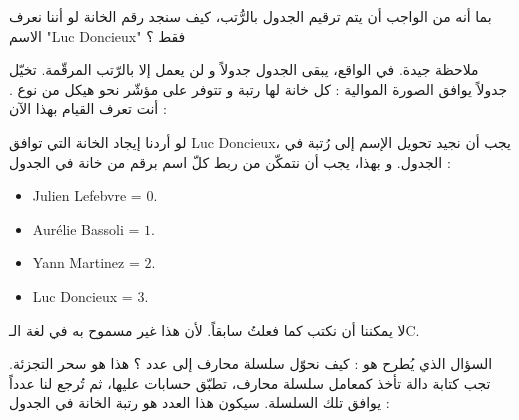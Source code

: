\begin{question}
بما أنه من الواجب أن يتم ترقيم الجدول بالرُّتب، كيف سنجد رقم الخانة لو أننا نعرف الاسم
"\textenglish{Luc Doncieux}"
 فقط ؟
\end{question}

ملاحظة جيدة. في الواقع، يبقى الجدول جدولاً و لن يعمل إلا بالرّتب المرقّمة. تخيّل جدولاً يوافق الصورة الموالية : كل خانة لها رتبة و تتوفر على مؤشّر نحو هيكل من نوع
.
أنت تعرف القيام بهذا الآن :


 لو أردنا إيجاد الخانة التي توافق
\textenglish{Luc Doncieux}،
 يجب أن نجيد تحويل الإسم إلى رُتبة في الجدول. و بهذا، يجب أن نتمكّن من ربط كلّ اسم برقم من خانة في الجدول :

\begin{itemize}
	\item \textenglish{Julien Lefebvre} = $0$.
	\item \textenglish{Aurélie Bassoli} = $1$.
	\item \textenglish{Yann Martinez} = $2$.
	\item \textenglish{Luc Doncieux} = $3$.
\end{itemize}

لا يمكننا أن نكتب
كما فعلتُ سابقاً. لأن هذا غير مسموح به في لغة الـ\textenglish{C}.

السؤال الذي يُطرح هو : كيف نحوّل سلسلة محارف إلى عدد ؟ هذا هو سحر التجزئة. تجب كتابة دالة تأخذ كمعامل سلسلة محارف، تطبّق حسابات عليها، ثم تُرجع لنا عدداً يوافق تلك السلسلة. سيكون هذا العدد هو رتبة الخانة في الجدول :


